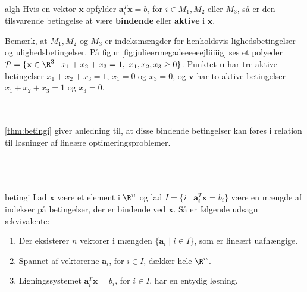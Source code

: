 %
\begin{defn}{}{algh}
Hvis en vektor $\textbf{x}$ opfylder $\textbf{a}^T_i\textbf{x}= b_i$ for $i \in M_1, M_2$ eller $M_3$, så er den tilsvarende betingelse at være \textbf{bindende} eller \textbf{aktive} i $\textbf{x}$.
\end{defn}\noindent
%
Bemærk, at $M_1, M_2$ og $M_3$ er indeksmængder for henholdsvis lighedsbetingelser og ulighedsbetingelser.
På figur \ref{fig:julieermegadeeeeeejliiiiig} ses et polyeder $\mathcal{P}= \{ \mathbf{x} \in \R^3 \mid x_1 + x_2 + x_3 = 1, \text{  } x_1 , x_2, x_3 \geq 0  \}$. 
Punktet $\textbf{u}$ har tre aktive betingelser $x_1 + x_2 + x_3 = 1$, $x_1=0$ og $x_3=0$, og $\mathbf{v}$ har to aktive betingelser $x_1 + x_2 + x_3 = 1$ og $x_3=0$.
%

\\\\
%
\ref{thm:betingi} giver anledning til, at disse bindende betingelser kan føres i relation til løsninger af lineære optimeringsproblemer.
\\\\
\phantom{Hej}
\\\\
%
%
\begin{thm}{}{betingi}
Lad $\textbf{x}$ være et element i $\R^n$ og lad $I=\{i \mid \textbf{a}^T_i\textbf{x}=b_i\}$ være en mængde af indekser på betingelser, der er bindende ved $\textbf{x}$.
Så er følgende udsagn ækvivalente:
%
\begin{enumerate}[label=(\alph*)]
\item Der eksisterer $n$ vektorer i mængden $\{\textbf{a}_i \mid i \in I \}$, som er lineært uafhængige.
\item Spannet af vektorerne $\textbf{a}_i$, for $i \in I$, dækker hele $\R^n$.
\item Ligningssystemet $\textbf{a}^T_i\textbf{x}= b_i$, for $i \in I$, har en entydig løsning.
\end{enumerate}
\end{thm}
%
